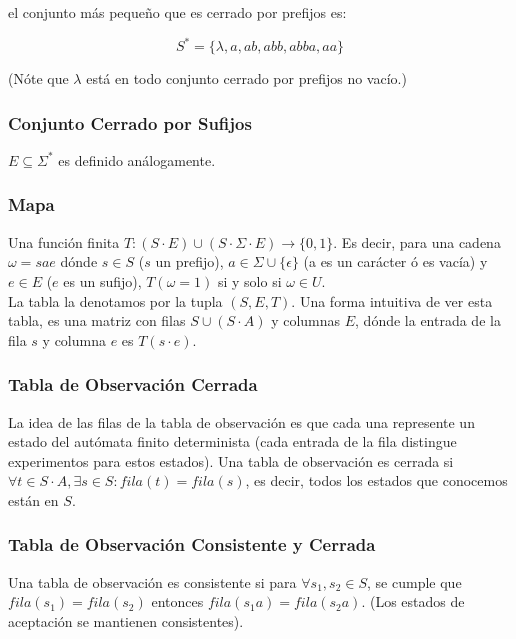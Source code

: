 \documentclass[12pt]{amsart}
\begin{document}
el conjunto más pequeño que es cerrado por prefijos es:

\[ S^{*} = \{ \lambda, a, ab, abb, abba, aa \} \]

(Nóte que $\lambda$ está en todo conjunto cerrado por prefijos no vacío.)

\subsubsection{Conjunto Cerrado por Sufijos}

$E \subseteq \Sigma^{*}$ es definido análogamente.

\subsubsection{Mapa}

Una función finita $T: (S \cdot E) \cup (S \cdot \Sigma \cdot E) \longrightarrow \{0,1\}$. Es decir, para una cadena  $\omega = sae$ dónde $s \in S$ ($s$ un prefijo), $a \in \Sigma \cup \{ \epsilon \}$ (a es un carácter ó es vacía) y $e \in E$ ($e$ es un sufijo), $T(\omega = 1)$ si y solo si $\omega \in U$. \\

La tabla la denotamos por la tupla $(S,E,T)$. Una forma intuitiva de ver esta tabla, es una matriz con filas $S \cup (S \cdot A)$ y columnas $E$, dónde la entrada de la fila $s$ y columna $e$ es $T(s \cdot e)$. \\

\subsubsection{Tabla de Observación Cerrada}

La idea de las filas de la tabla de observación es que cada una represente un estado del autómata finito determinista (cada entrada de la fila distingue experimentos para estos estados). Una tabla de observación es cerrada si $\forall t \in S \cdot A, \exists s \in S: fila(t) = fila(s)$, es decir, todos los estados que conocemos están en $S$.

\subsubsection{Tabla de Observación Consistente y Cerrada}

Una tabla de observación es consistente si para $\forall s_1, s_2 \in S$, se cumple que $fila(s_1) = fila(s_2)$ entonces $fila(s_1 a) = fila(s_2 a)$. (Los estados de aceptación se mantienen consistentes). \\
\end{document}
